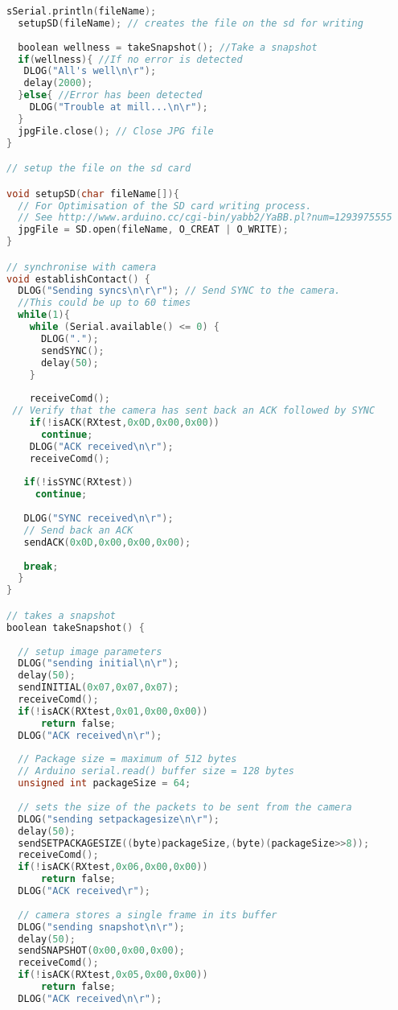 \begin{lstlisting}[language=C, label = lst:arduino_captureTest, caption = {Arduino code, used up until the point we started using the Il Matto. This was written in the arduino-022 IDE}]
  sSerial.println(fileName);
  setupSD(fileName); // creates the file on the sd for writing
  
  boolean wellness = takeSnapshot(); //Take a snapshot
  if(wellness){ //If no error is detected
   DLOG("All's well\n\r");
   delay(2000);
  }else{ //Error has been detected
    DLOG("Trouble at mill...\n\r");
  }
  jpgFile.close(); // Close JPG file
}

// setup the file on the sd card

void setupSD(char fileName[]){
  // For Optimisation of the SD card writing process.
  // See http://www.arduino.cc/cgi-bin/yabb2/YaBB.pl?num=1293975555
  jpgFile = SD.open(fileName, O_CREAT | O_WRITE);
}

// synchronise with camera
void establishContact() {
  DLOG("Sending syncs\n\r\r"); // Send SYNC to the camera.
  //This could be up to 60 times
  while(1){
    while (Serial.available() <= 0) {
      DLOG(".");
      sendSYNC();
      delay(50);
    }
    
    receiveComd();
 // Verify that the camera has sent back an ACK followed by SYNC
    if(!isACK(RXtest,0x0D,0x00,0x00))
      continue;
    DLOG("ACK received\n\r");
    receiveComd();
     
   if(!isSYNC(RXtest))
     continue;
   
   DLOG("SYNC received\n\r");
   // Send back an ACK
   sendACK(0x0D,0x00,0x00,0x00);
   
   break;
  }
}

// takes a snapshot
boolean takeSnapshot() {
  
  // setup image parameters
  DLOG("sending initial\n\r");
  delay(50);
  sendINITIAL(0x07,0x07,0x07);
  receiveComd();
  if(!isACK(RXtest,0x01,0x00,0x00))
      return false;
  DLOG("ACK received\n\r");
  
  // Package size = maximum of 512 bytes
  // Arduino serial.read() buffer size = 128 bytes
  unsigned int packageSize = 64;
  
  // sets the size of the packets to be sent from the camera
  DLOG("sending setpackagesize\n\r");
  delay(50);
  sendSETPACKAGESIZE((byte)packageSize,(byte)(packageSize>>8));
  receiveComd();
  if(!isACK(RXtest,0x06,0x00,0x00))
      return false;
  DLOG("ACK received\r");
  
  // camera stores a single frame in its buffer  
  DLOG("sending snapshot\n\r");
  delay(50);
  sendSNAPSHOT(0x00,0x00,0x00);
  receiveComd();
  if(!isACK(RXtest,0x05,0x00,0x00))
      return false;
  DLOG("ACK received\n\r");
      

\end{lstlisting}
